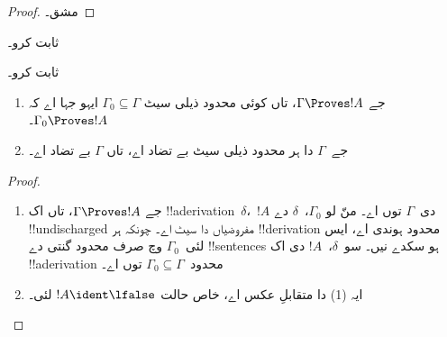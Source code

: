 \documentclass[../../../include/open-logic-section]{subfiles}
\begin{document}
\begin{proof}
مشق۔
\end{proof}

\begin{prob}
 ثابت کرو۔
\end{prob}
\tagendprob

\begin{prob}
 ثابت کرو۔
\end{prob}
\tagendprob

\begin{prop}
  \begin{enumerate}
  \item جے $\Gamma \Proves !A$، تاں کوئی محدود ذیلی سیٹ $\Gamma_0
    \subseteq \Gamma$ ایہو جہا اے کہ $\Gamma_0 \Proves !A$۔
  \item جے~$\Gamma$ دا ہر محدود ذیلی سیٹ
    بے تضاد اے، تاں $\Gamma$ بے تضاد اے۔
  \end{enumerate}
\end{prop}

\begin{proof}
  \begin{enumerate}
    \item جے $\Gamma \Proves !A$، تاں
      اک !!a{derivation}~$\delta$،~$!A$ دی~$\Gamma$ توں اے۔ منّ لو $\Gamma_0$،~$\delta$ دے
      !!{undischarged} مفروضیاں دا سیٹ اے۔ چونکہ ہر !!{derivation} محدود
      ہوندی اے، ایس لئی~$\Gamma_0$ وچ صرف محدود گنتی دے
      !!{sentence}s ہو سکدے نیں۔ سو~$\delta$،~$!A$ دی اک !!a{derivation} محدود~$\Gamma_0 \subseteq \Gamma$
      توں اے۔
    \item ایہ (1) دا متقابلِ عکس اے، خاص حالت $!A
      \ident \lfalse$ لئی۔
  \end{enumerate}
\end{proof}
\end{document}
